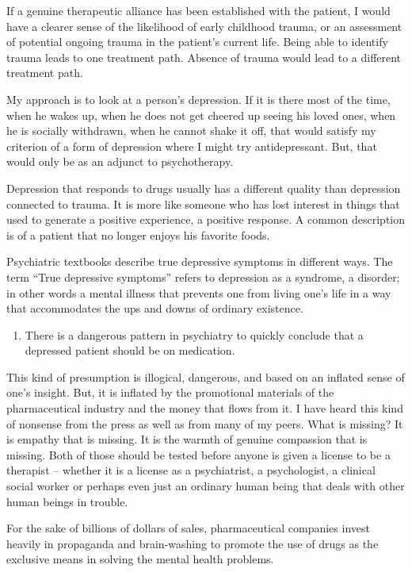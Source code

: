 \documentclass[]{book}
\providecommand{\tightlist}{%
  \setlength{\itemsep}{0pt}\setlength{\parskip}{0pt}}
\begin{document}
If a genuine therapeutic alliance has been established with the patient, I would have a clearer sense of the likelihood of early childhood trauma, or an assessment of potential ongoing trauma in the patient's current life. Being able to identify trauma leads to one treatment path. Absence of trauma would lead to a different treatment path.

My approach is to look at a person's depression. If it is there most of the time, when he wakes up, when he does not get cheered up seeing his loved ones, when he is socially withdrawn, when he cannot shake it off, that would satisfy my criterion of a form of depression where I might try antidepressant. But, that would only be as an adjunct to psychotherapy.

Depression that responds to drugs usually has a different quality than depression connected to trauma. It is more like someone who has lost interest in things that used to generate a positive experience, a positive response. A common description is of a patient that no longer enjoys his favorite foods.

Psychiatric textbooks describe true depressive symptoms in different ways. The term ``True depressive symptoms'' refers to depression as a syndrome, a disorder; in other words a mental illness that prevents one from living one's life in a way that accommodates the ups and downs of ordinary existence.

\begin{enumerate}
\def\labelenumi{\arabic{enumi}.}
\setcounter{enumi}{6}
\tightlist
\item
  There is a dangerous pattern in psychiatry to quickly conclude that a depressed patient should be on medication.
\end{enumerate}

This kind of presumption is illogical, dangerous, and based on an inflated sense of one's insight. But, it is inflated by the promotional materials of the pharmaceutical industry and the money that flows from it. I have heard this kind of nonsense from the press as well as from many of my peers. What is missing? It is empathy that is missing. It is the warmth of genuine compassion that is missing. Both of those should be tested before anyone is given a license to be a therapist -- whether it is a license as a psychiatrist, a psychologist, a clinical social worker or perhaps even just an ordinary human being that deals with other human beings in trouble.

For the sake of billions of dollars of sales, pharmaceutical companies invest heavily in propaganda and brain-washing to promote the use of drugs as the exclusive means in solving the mental health problems.
\end{document}
